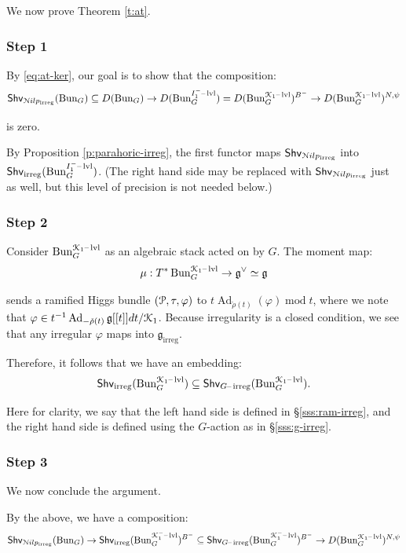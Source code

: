 \documentclass[reqno,11pt]{amsart}
\numberwithin{equation}{subsection}
\theoremstyle{remark}
\newcommand{\sK}{{\EuScript K}}
\newcommand{\sN}{{\EuScript N}}
\newcommand{\sP}{{\EuScript P}}
\newcommand{\fg}{{\mathfrak g}}
\newcommand{\on}{\operatorname}
\newcommand{\mathendash}{\text{\textendash}}
\newcommand{\Ad}{\on{Ad}}
\newcommand{\vph}{\varphi}
\newcommand{\Bun}{\on{Bun}}
\renewcommand{\subset}{\subseteq}
\newcommand{\Shv}{\mathsf{Shv}}
\newcommand{\Nilp}{\sN ilp}
\newcommand{\irreg}{\on{irreg}}
\newcommand{\Girreg}{G\mathendash\irreg}
\newcommand{\level}{\mathendash\on{lvl}}
\begin{document}
We now prove Theorem \ref{t:at}.

\subsubsection{Step 1}

By \eqref{eq:at-ker}, our goal is to show that the composition:
%
\[
\Shv_{\Nilp_{\irreg}}(\Bun_G) \subset D(\Bun_G) \to D(\Bun_G^{I_1^-\level}) = 
D(\Bun_G^{\sK_1\level})^{B^-}
\to D(\Bun_G^{\sK_1\level})^{N,\psi}
\]

\noindent is zero. 

By Proposition \ref{p:parahoric-irreg}, the first functor maps
$\Shv_{\Nilp_{\irreg}}$ into $\Shv_{\irreg}(\Bun_G^{I_1^-\level})$.
(The right hand side may be replaced with $\Shv_{\Nilp_{\irreg}}$ just as well,
but this level of precision is not needed below.)

\subsubsection{Step 2}

Consider $\Bun_G^{\sK_1\level}$ as an algebraic stack acted on by
$G$. The moment map:
%
\[
\mu:T^*\Bun_G^{\sK_1\level}
\to \fg^{\vee} \simeq \fg
\]

\noindent sends a ramified Higgs bundle $(\sP,\tau,\vph)$
to $t\Ad_{\check{\rho}(t)}(\vph) \on{mod }t$, where we note that
$\vph \in t^{-1}\Ad_{-\check{\rho}(t)}\fg[[t]]dt/\sK_1$.
Because irregularity is a closed condition, we see that any 
irregular $\vph$ maps into $\fg_{\irreg}$.

Therefore, it follows that we have an embedding:
%
\[
\Shv_{\irreg}(\Bun_G^{\sK_1\level}) \subset \Shv_{\Girreg}(\Bun_G^{\sK_1\level}).
\]

\noindent Here for clarity, we say that the left hand 
side is defined in \S \ref{sss:ram-irreg}, and the
right hand side is defined using the $G$-action as in \S \ref{sss:g-irreg}.


\subsubsection{Step 3}

We now conclude the argument.

By the above, we have a composition:
%
\[
\Shv_{\Nilp_{\irreg}}(\Bun_G) \to \Shv_{\irreg}(\Bun_G^{\sK_1^-\level})^{B^-} 
\subset  \Shv_{\Girreg}(\Bun_G^{\sK_1^-\level})^{B^-} 
\to
D(\Bun_G^{\sK_1\level})^{N,\psi}
\]
\end{document}
